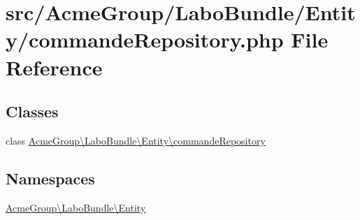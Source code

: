 \hypertarget{commande_repository_8php}{\section{src/\+Acme\+Group/\+Labo\+Bundle/\+Entity/commande\+Repository.php File Reference}
\label{commande_repository_8php}
}
\subsection*{Classes}
\begin{DoxyCompactItemize}
\item 
class \hyperlink{class_acme_group_1_1_labo_bundle_1_1_entity_1_1commande_repository}{Acme\+Group\textbackslash{}\+Labo\+Bundle\textbackslash{}\+Entity\textbackslash{}commande\+Repository}
\end{DoxyCompactItemize}
\subsection*{Namespaces}
\begin{DoxyCompactItemize}
\item 
 \hyperlink{namespace_acme_group_1_1_labo_bundle_1_1_entity}{Acme\+Group\textbackslash{}\+Labo\+Bundle\textbackslash{}\+Entity}
\end{DoxyCompactItemize}
